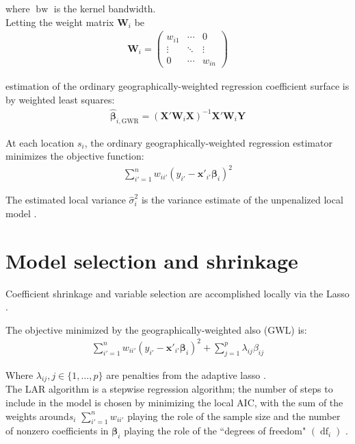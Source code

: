 \documentclass[authoryear, review, 11pt]{elsarticle}
\DeclareMathOperator*{\bw}{\mbox{bw}}
\DeclareMathOperator*{\df}{\mbox{df}}
\begin{document}
	where $\bw$ is the kernel bandwidth.\\
	
	Letting the weight matrix $\bm{W}_i$ be	
	\begin{eqnarray}
		\bm{W}_i =  \left( \begin{array}{ccc} w_{i1} & \cdots & 0 \\ \vdots & \ddots & \vdots \\ 0 & \cdots & w_{in} \end{array} \right)
	\end{eqnarray}
	
	estimation of the ordinary geographically-weighted regression coefficient surface is by weighted least squares:	
	\begin{eqnarray}
		\hat{\bm{\beta}}_{i, \mbox{GWR}} = \left( \bm{X}'\bm{W}_i\bm{X} \right)^{-1} \bm{X}'\bm{W}_i\bm{Y}
	\end{eqnarray}
	
	
	At each location $s_i$, the ordinary geographically-weighted regression estimator minimizes the objective function:
	\begin{eqnarray}
		\sum_{i'=1}^n w_{ii'} \left(y_{i'} - \bm{x}'_{i'} \bm{\beta}_i \right)^2
	\end{eqnarray}
	
	 The estimated local variance $\hat{\sigma}_i^2$ is the variance estimate of the unpenalized local model \citep{Zou:2007}.
	
\section{Model selection and shrinkage \label{section:method}}
	Coefficient shrinkage and variable selection are accomplished locally via the Lasso \citep{Tibshirani:1996}.
	
	The objective minimized by the geographically-weighted also (GWL) is:	
	\begin{eqnarray}
		\sum_{i'=1}^n w_{ii'} \left(y_{i'} - \bm{x}'_{i'} \bm{\beta}_i \right)^2 + \sum_{j=1}^p \lambda_{ij} \beta_{ij}
	\end{eqnarray}
	
	Where $\lambda_{ij}, j \in \{1, \dots, p\}$ are penalties from the adaptive lasso \citep{Zou:2006}.\\
	
	The LAR algorithm is a stepwise regression algorithm; the number of steps to include in the model is chosen by minimizing the local AIC, with the sum of the weights around$s_i$ $\sum_{i'=1}^n w_{ii'}$ playing the role of the sample size and the number of nonzero coefficients in $\bm{\beta}_i$ playing the role of the ``degrees of freedom" $\left( \df_i \right)$ \citep{Zou:2007}.
\end{document}
